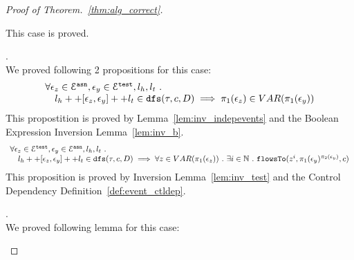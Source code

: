 \begin{proof}[Proof of Theorem.~\ref{thm:alg_correct}]
\begin{case}
\begin{subcase}
\begin{subsubcase}
\begin{subproof}
\end{subproof}
%
%
This case is proved.
%
\end{subsubcase}
%
\end{subcase}
%
%
\begin{subcase}[ $l_e = l_h ++ {[\event_z, \event_b, \event_y]} ++ l_t$ ].
\\
We proved following 2 propositions for this case:
\begin{equation}
  \begin{array}{l}
    \forall \mathtt{\epsilon}_z \in \mathcal{E}^{\mathtt{{asn}}}, \mathtt{\epsilon}_y \in \mathcal{E}^{\mathtt{{test}}}, l_h, l_t ~.~
     \\ \quad 
     l_h ++ [\mathtt{\epsilon}_z, \mathtt{\epsilon}_y] ++ l_t \in \mathtt{dfs}(\mathtt{\tau}, c, D)
    \implies \pi_1(\mathtt{\epsilon}_z) \in VAR(\pi_1(\mathtt{\epsilon}_y))
  \end{array}
  \end{equation}
This propostition is proved by Lemma~\ref{lem:inv_indepevents} and the Boolean Expression Inversion Lemma~\ref{lem:inv_b}.
%
  \begin{equation}
  \begin{array}{l}
    \forall \mathtt{\epsilon}_z \in \mathcal{E}^{\mathtt{{test}}}, \mathtt{\epsilon}_y \in \mathcal{E}^{\mathtt{{asn}}}, l_h, l_t ~.~
     \\ \quad 
     l_h ++ [\mathtt{\epsilon}_z, \mathtt{\epsilon}_y] ++ l_t \in \mathtt{dfs}(\mathtt{\tau}, c, D)
    \implies \forall z \in VAR(\pi_1(\mathtt{\epsilon}_z)) ~.~ \exists i \in\mathbb{N} ~.~
    \mathtt{flowsTo}(z^i, \pi_1(\mathtt{\epsilon}_y)^{\pi_2(\mathtt{\epsilon}_y)}, c)
  \end{array}
  \end{equation}
%
This proposition is proved by Inversion Lemma~\ref{lem:inv_test} and the Control Dependency Definition~\ref{def:event_ctldep}.
\end{subcase}
%
%
\begin{subcase}[ $l_e = l_h ++ {[\event_{b_1}, \cdots, \event_{b_n}]} ++ l_t$ ].
%
\\
We proved following lemma for this case:

\end{subcase}
\end{case}
\end{proof}
